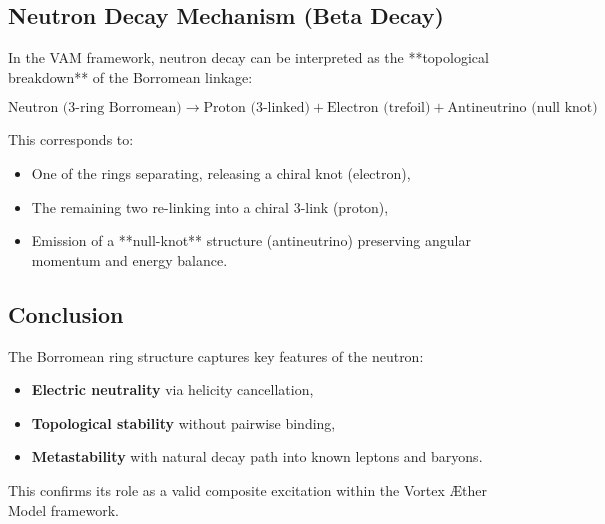 \subsection{Neutron Decay Mechanism (Beta Decay)}

In the VAM framework, neutron decay can be interpreted as the **topological breakdown** of the Borromean linkage:

\[
\text{Neutron (3-ring Borromean)} \rightarrow \text{Proton (3-linked)} + \text{Electron (trefoil)} + \text{Antineutrino (null knot)}
\]

This corresponds to:

\begin{itemize}
    \item One of the rings separating, releasing a chiral knot (electron),
    \item The remaining two re-linking into a chiral 3-link (proton),
    \item Emission of a **null-knot** structure (antineutrino) preserving angular momentum and energy balance.
\end{itemize}

\subsection{Conclusion}

The Borromean ring structure captures key features of the neutron:
\begin{itemize}
    \item \textbf{Electric neutrality} via helicity cancellation,
    \item \textbf{Topological stability} without pairwise binding,
    \item \textbf{Metastability} with natural decay path into known leptons and baryons.
\end{itemize}

This confirms its role as a valid composite excitation within the Vortex Æther Model framework.
